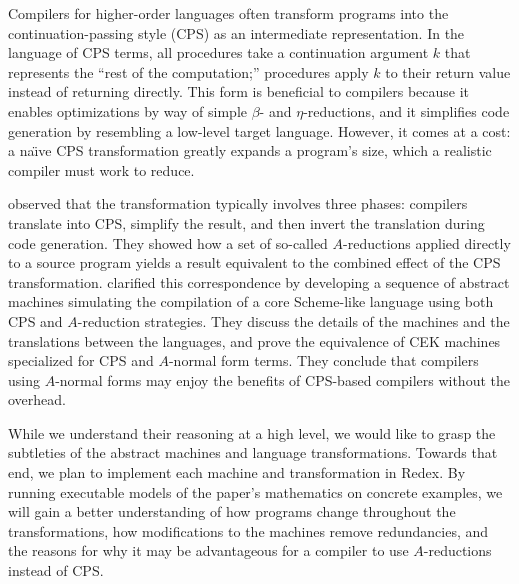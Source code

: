 \documentclass[11pt]{article}
\begin{document}
\thispagestyle{fancy}

Compilers for higher-order languages often transform programs into the
continuation-passing style (CPS) as an intermediate representation. In the
language of CPS terms, all procedures take a continuation argument $k$
that represents the ``rest of the computation;'' procedures apply $k$ to their
return value instead of returning directly. This form is beneficial to
compilers because it enables optimizations by way of simple $\beta$- and
$\eta$-reductions, and it simplifies code generation by resembling a low-level
target language. However, it comes at a cost: a na\"{\i}ve CPS transformation
greatly expands a program's size, which a realistic compiler must work to
reduce.

\citet{Sabry:1992zr} observed that the transformation typically involves
three phases: compilers translate into CPS, simplify the result, and then
invert the translation during code generation. They showed how
a set of so-called $A$-reductions applied directly to a source program yields a
result equivalent to the combined effect of the CPS transformation.
\citet{Flanagan:1993fk} clarified this correspondence by developing
a sequence of abstract machines simulating the compilation of a core
Scheme-like language using both CPS and $A$-reduction strategies.
They discuss the details of the machines and the translations between the
languages, and prove the equivalence of CEK machines specialized for CPS and
$A$-normal form terms. 
They conclude that compilers
using $A$-normal forms may enjoy the benefits of CPS-based compilers without
the overhead.


While we understand their reasoning at a high level, we would like to grasp
the subtleties of the abstract machines and language transformations.
Towards that end, we plan to implement each machine and transformation
in Redex. By running executable models of the paper's mathematics on concrete
examples, we will gain a better understanding of how programs change throughout
the transformations, how modifications to the machines remove redundancies, and
the reasons for why it may be advantageous for a compiler to use $A$-reductions
instead of CPS.
\end{document}
